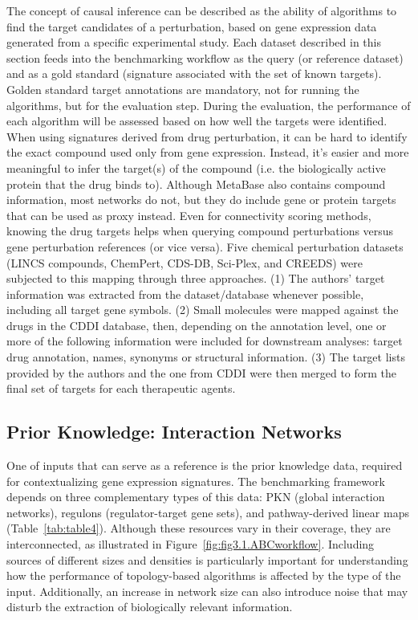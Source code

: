 The concept of causal inference can be described as the ability of algorithms to find the target candidates of a perturbation, based on gene expression data generated from a specific experimental study. 
Each dataset described in this section feeds into the benchmarking workflow as the query (or reference dataset) and as a gold standard (signature associated with the set of known targets). 
Golden standard target annotations are mandatory, not for running the algorithms, but for the evaluation step. 
During the evaluation, the performance of each algorithm will be assessed based on how well the targets were identified. 
When using signatures derived from drug perturbation, it can be hard to identify the exact compound used only from gene expression. 
Instead, it's easier and more meaningful to infer the target(s) of the compound (i.e. the biologically active protein that the drug binds to). 
Although MetaBase also contains compound information, most networks do not, but they do include gene or protein targets that can be used as proxy instead.  
Even for connectivity scoring methods, knowing the drug targets helps when querying compound perturbations versus gene perturbation references (or vice versa). 
Five chemical perturbation datasets (\gls{LINCS} compounds, ChemPert, \gls{CDS-DB}, Sci-Plex, and \gls{CREEDS}) were subjected to this mapping through three approaches. 
(1) The authors' target information was extracted from the dataset/database whenever possible, including all target gene symbols. 
(2) Small molecules were mapped against the drugs in the \gls{CDDI} database,  then,  depending on the annotation level, one or more of the following information were included for downstream analyses: target drug annotation, names, synonyms or structural information. 
(3) The target lists provided by the authors and the one from \gls{CDDI} were then merged to form the final set of targets for each therapeutic agents.



\subsection{Prior Knowledge: Interaction Networks} %
\label{sec:priorknowledgeinteractionnetworks}

One of inputs that can serve as a reference is the prior knowledge data, required for contextualizing gene expression signatures. 
The benchmarking framework depends on three complementary types of this data: \gls{PKN} (global interaction networks), regulons (regulator-target gene sets), and pathway-derived linear maps (Table~\ref{tab:table4}). 
Although these resources vary in their coverage, they are interconnected, as illustrated in Figure~\ref{fig:fig3.1.ABCworkflow}. 
Including sources of different sizes and densities is particularly important for understanding how the performance of topology-based algorithms is affected by the type of the input. 
Additionally, an increase in network size can also introduce noise that may disturb the extraction of biologically relevant information. 

